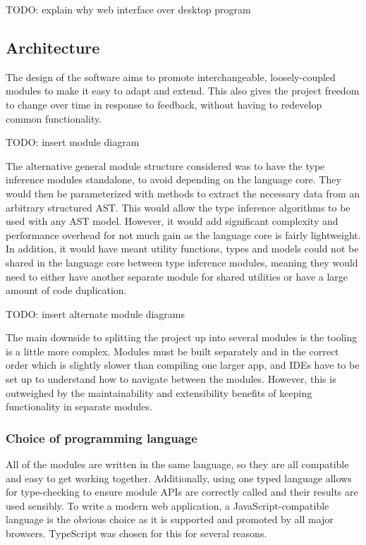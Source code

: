\documentclass[a4paper,fleqn,12pt]{article}
\begin{document}
TODO: explain why web interface over desktop program
\subsection{Architecture}\label{id:h.l33hnjbawceh}
The design of the software aims to promote interchangeable, loosely-coupled modules to make it easy to adapt and extend. This also gives the project freedom to change over time in response to feedback, without having to redevelop common functionality.

TODO: insert module diagram

The alternative general module structure considered was to have the type inference modules standalone, to avoid depending on the language core. They would then be parameterized with methods to extract the necessary data from an arbitrary structured AST. This would allow the type inference algorithms to be used with any AST model. However, it would add significant complexity and performance overhead for not much gain as the language core is fairly lightweight. In addition, it would have meant utility functions, types and models could not be shared in the language core between type inference modules, meaning they would need to either have another separate module for shared utilities or have a large amount of code duplication.

TODO: insert alternate module diagrams

The main downside to splitting the project up into several modules is the tooling is a little more complex. Modules must be built separately and in the correct order which is slightly slower than compiling one larger app, and IDEs have to be set up to understand how to navigate between the modules. However, this is outweighed by the maintainability and extensibility benefits of keeping functionality in separate modules.

\subsubsection{Choice of programming language}\label{id:h.dj2rwwqr30vu}
All of the modules are written in the same language, so they are all compatible and easy to get working together. Additionally, using one typed language allows for type-checking to ensure module APIs are correctly called and their results are used sensibly. To write a modern web application, a JavaScript-compatible language is the obvious choice as it is supported and promoted by all major browsers. TypeScript was chosen for this for several reasons.
\end{document}
